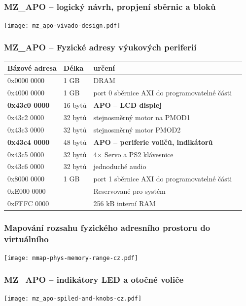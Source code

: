 \documentclass{beamer}
\begin{document}
\begin{frame}
\frametitle{MZ\_APO -- logický návrh, propjení sběrnic a bloků}

\texttt{[image: mz\_apo-vivado-design.pdf]}

\end{frame}

\begin{frame}
\frametitle{MZ\_APO -- Fyzické adresy výukových periferií}

\begin{tabular}{|l|l|l|l|} \hline
Bázové adresa & Délka & určení \\\hline
0x0000 0000 & 1 GB &  DRAM \\\hline
0x4000 0000 & 1 GB & port 0 sběrnice AXI do programovatelné části \\\hline
\textbf{0x43c0 0000} & 16 bytů & \textbf{APO -- LCD displej} \\\hline
0x43c2 0000 & 32 bytů & stejnosměrný motor na PMOD1 \\\hline
0x43c3 0000 & 32 bytů & stejnosměrný motor PMOD2 \\\hline
\textbf{0x43c4 0000} & 48 bytů & \textbf{APO -- periferie voličů, indikátorů} \\\hline
0x43c5 0000 & 32 bytů & 4$\times$ Servo a PS2 klávesnice \\\hline
0x43c6 0000 & 32 bytů & jednoduché audio \\\hline
0x8000 0000 & 1 GB & port 1 sběrnice AXI do programovatelné části \\\hline
0xE000 0000 &      & Reservované pro systém\\\hline
0xFFFC 0000 &      & 256 kB interní RAM \\\hline

\end{tabular} 

\end{frame}


\begin{frame}
\frametitle{Mapování rozsahu fyzického adresního prostoru do virtuálního}

\texttt{[image: mmap-phys-memory-range-cz.pdf]}

\end{frame}

\begin{frame}
\frametitle{MZ\_APO -- indikátory LED a otočné voliče}

\texttt{[image: mz\_apo-spiled-and-knobs-cz.pdf]}

\end{frame}
\end{document}
